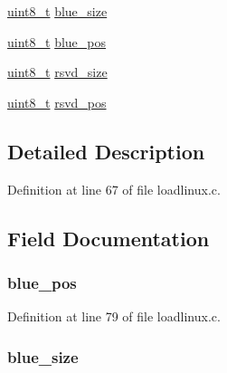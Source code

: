 \begin{DoxyCompactItemize}
\item 
\hyperlink{arch__types_8h_aba7bc1797add20fe3efdf37ced1182c5}{uint8\-\_\-t} \hyperlink{structatag__videolfb_a4b0c692ff987aeedc4922031b972e45f}{blue\-\_\-size}
\item 
\hyperlink{arch__types_8h_aba7bc1797add20fe3efdf37ced1182c5}{uint8\-\_\-t} \hyperlink{structatag__videolfb_aec62dfb090ca6c08e0df6748193598e5}{blue\-\_\-pos}
\item 
\hyperlink{arch__types_8h_aba7bc1797add20fe3efdf37ced1182c5}{uint8\-\_\-t} \hyperlink{structatag__videolfb_a9d840fbd8d826b24ae26dededb556fa0}{rsvd\-\_\-size}
\item 
\hyperlink{arch__types_8h_aba7bc1797add20fe3efdf37ced1182c5}{uint8\-\_\-t} \hyperlink{structatag__videolfb_a631ed037a09490663fbd27eb4224fc47}{rsvd\-\_\-pos}
\end{DoxyCompactItemize}


\subsection{\-Detailed \-Description}


\-Definition at line 67 of file loadlinux.\-c.



\subsection{\-Field \-Documentation}
\hypertarget{structatag__videolfb_aec62dfb090ca6c08e0df6748193598e5}{
\subsubsection[{blue\-\_\-pos}]{ {\bf blue\-\_\-pos}}}\label{structatag__videolfb_aec62dfb090ca6c08e0df6748193598e5}


\-Definition at line 79 of file loadlinux.\-c.

\hypertarget{structatag__videolfb_a4b0c692ff987aeedc4922031b972e45f}{
\subsubsection[{blue\-\_\-size}]{ {\bf blue\-\_\-size}}}\label{structatag__videolfb_a4b0c692ff987aeedc4922031b972e45f}


